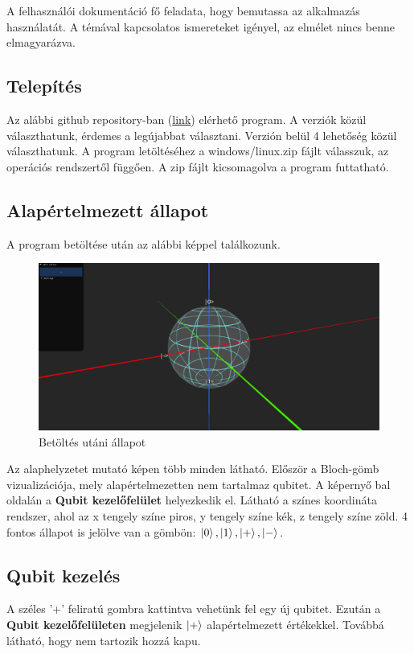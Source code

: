 \documentclass[fontsize=12pt,a4paper]{article}
\begin{document}
A felhasználói dokumentáció fő feladata, hogy bemutassa az alkalmazás használatát. A témával kapcsolatos ismereteket igényel, az elmélet nincs benne elmagyarázva.

\subsection{Telepítés}
Az alábbi github repository-ban (\href{https://github.com/RandomByteFF/bloch-sphere-simulator/releases/}{link}) elérhető program. A verziók közül választhatunk, érdemes a legújabbat választani. Verzión belül 4 lehetőség közül választhatunk. A program letöltéséhez a windows/linux.zip fájlt válasszuk, az operációs rendszertől függően. A zip fájlt kicsomagolva a program futtatható.

\subsection{Alapértelmezett állapot}
A program betöltése után az alábbi képpel találkozunk.

\begin{figure}[h]
    \centering
    \includegraphics[width=1.0\linewidth]{App/default.png} 
    \caption{Betöltés utáni állapot}
\end{figure}

Az alaphelyzetet mutató képen több minden látható. Először a Bloch-gömb vizualizációja, mely alapértelmezetten nem tartalmaz qubitet. A képernyő bal oldalán a \textbf{Qubit kezelőfelület} helyezkedik el. Látható a színes koordináta rendszer, ahol az x tengely színe piros, y tengely színe kék, z tengely színe zöld. 4 fontos állapot is jelölve van a gömbön: $\ket{0}, \ket{1}, \ket{+}, \ket{-}$. 

\newpage
\subsection{Qubit kezelés}
A széles '+' feliratú gombra kattintva vehetünk fel egy új qubitet. Ezután a \textbf{Qubit kezelőfelületen} megjelenik $\ket{+}$ alapértelmezett értékekkel. Továbbá látható, hogy nem tartozik hozzá kapu. 
\end{document}
